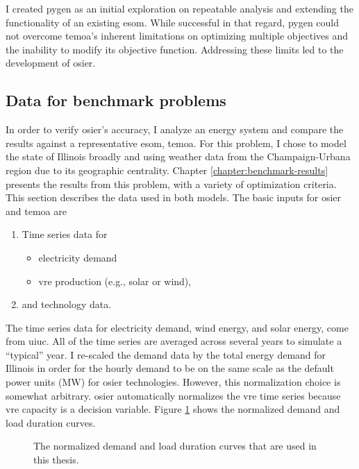 I created \ac{pygen} as an initial exploration on repeatable analysis and
extending the functionality of an existing \ac{esom}. While successful in
that regard, \ac{pygen} could not overcome \ac{temoa}'s inherent limitations
on optimizing multiple objectives and the inability to modify its objective 
function. Addressing these limits led to the development of \ac{osier}.


\subsection{Data for benchmark problems}
 In order
to verify \ac{osier}'s accuracy, I analyze an energy system and compare the
results against a representative \ac{esom}, \ac{temoa}. For this problem, I
chose to model the state of Illinois broadly and using weather data from the
Champaign-Urbana region due to its geographic centrality. Chapter
\ref{chapter:benchmark-results} presents the results from this problem, with a
variety of optimization criteria. This section describes the data used in both
models. The basic inputs for \ac{osier} and \ac{temoa} are
\begin{enumerate}
    \item Time series data for
    \begin{itemize}
      \item electricity demand
      \item \ac{vre} production (e.g., solar or wind),
    \end{itemize} 
    \item and technology data.
\end{enumerate}
\noindent
The time series data for electricity demand, wind energy, and solar energy, come
from \ac{uiuc}. All of the time series are averaged across several years to
simulate a ``typical'' year. I re-scaled the demand data by the total energy
demand for Illinois in order for the hourly demand to be on the same scale as
the default power units (MW) for \ac{osier} technologies. However, this
normalization choice is somewhat arbitrary. \ac{osier} automatically normalizes
the \ac{vre} time series because \ac{vre} capacity is a decision variable.
Figure \ref{fig:normalized_ldc} shows the normalized demand and load duration
curves.


 \begin{figure}[h]
  \centering
  \resizebox{1\columnwidth}{!}{}
  \caption{The normalized demand and load duration curves that are used in this thesis.}
  \label{fig:normalized_ldc}
\end{figure}

\FloatBarrier